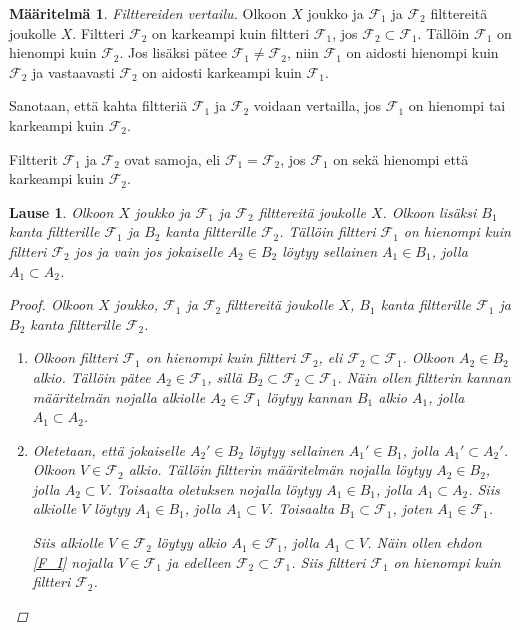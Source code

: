 \documentclass[12pt,a4paper,leqno]{report}
\newcommand{\F}{\mathcal{F}}
\theoremstyle{plain}
\newtheorem{lause}[equation]{Lause}
\theoremstyle{definition}
\newtheorem{maar}[equation]{Määritelmä}
\theoremstyle{remark}
\begin{document}
\begin{maar}
\emph{Filttereiden vertailu.}
Olkoon $X$ joukko ja $\F_1$ ja $\F_2$ filttereitä joukolle $X$. 
Filtteri $\F_2$ on karkeampi kuin filtteri $\F_1$, jos $\F_2\subset \F_1$. 
Tällöin $\F_1$ on hienompi kuin $\F_2$. 
Jos lisäksi pätee $\F_1\neq\F_2$, niin $\F_1$ on aidosti hienompi kuin $\F_2$ ja vastaavasti $\F_2$ on aidosti karkeampi kuin $\F_1$. 

Sanotaan, että kahta filtteriä $\F_1$ ja $\F_2$ voidaan vertailla, 
jos $\F_1$ on hienompi tai karkeampi kuin $\F_2$. 

Filtterit $\F_1$ ja $\F_2$ ovat samoja, eli $\F_1=\F_2$,
jos $\F_1$ on sekä hienompi että karkeampi kuin $\F_2$.
\end{maar}
\begin{lause}\label{filtterikantavertailu}
Olkoon $X$ joukko ja $\F_1$ ja $\F_2$ filttereitä joukolle $X$. 
Olkoon lisäksi $B_1$ kanta filtterille $\F_1$ ja $B_2$ kanta filtterille $\F_2$. 
Tällöin filtteri $\F_1$ on hienompi kuin filtteri $\F_2$ 
jos ja vain jos jokaiselle $A_2\in B_2$ löytyy 
sellainen $A_1\in B_1$, jolla $A_1\subset A_2$.
\begin{proof}
Olkoon $X$ joukko, $\F_1$ ja $\F_2$ filttereitä joukolle $X$, 
$B_1$ kanta filtterille $\F_1$ ja $B_2$ kanta filtterille $\F_2$. 
\begin{enumerate}
\item[$\Rightarrow$] 
Olkoon filtteri $\F_1$ on hienompi kuin filtteri $\F_2$, eli $\F_2\subset \F_1$. 
Olkoon $A_2\in B_2$ alkio. 
Tällöin pätee $A_2\in \F_1$, 
sillä $B_2\subset\F_2\subset \F_1$. 
Näin ollen filtterin kannan määritelmän nojalla 
alkiolle $A_2\in \F_1$ löytyy kannan $B_1$ 
alkio $A_1$, jolla $A_1\subset A_2$.
\item[$\Leftarrow$] 
Oletetaan, että 
jokaiselle $A_2'\in B_2$ löytyy 
sellainen $A_1'\in B_1$, jolla $A_1'\subset A_2'$. 
Olkoon $ V\in\F_2$ alkio. Tällöin 
filtterin määritelmän nojalla 
löytyy $A_2\in B_2$, jolla $A_2\subset V$. 
Toisaalta oletuksen nojalla 
löytyy $A_1\in B_1$, jolla $A_1\subset A_2$. 
Siis alkiolle $ V$ löytyy 
$A_1\in B_1$, jolla $A_1\subset V$. 
Toisaalta $B_1\subset \F_1$, 
joten $A_1\in \F_1$. 

Siis alkiolle $ V\in\F_2$ löytyy alkio
$A_1\in \F_1$, jolla $A_1\subset V$. 
Näin ollen ehdon \ref{F_I} nojalla $ V\in\F_1$ 
ja edelleen $\F_2\subset \F_1$. 
Siis filtteri $\F_1$ on hienompi kuin filtteri $\F_2$. 
\end{enumerate}
\end{proof}
\end{lause}
\end{document}
